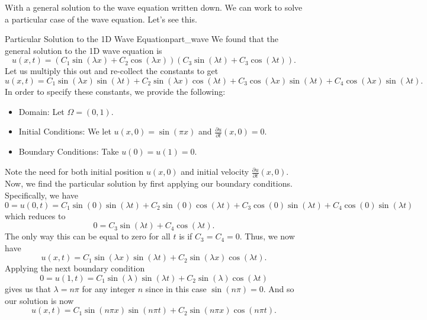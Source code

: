         With a general solution to the wave equation written down.  We can work to solve a particular case of the wave equation.  Let's see this.
        
        \begin{ex}{Particular Solution to the 1D Wave Equation}{part_wave}
        We found that the general solution to the 1D wave equation is
        \[
        u(x,t)=(C_1 \sin(\lambda x)+ C_2 \cos(\lambda x))(C_3 \sin(\lambda t)+ C_3 \cos(\lambda t)).
        \]
        Let us multiply this out and re-collect the constants to get
        \[
        u(x,t) = C_1 \sin(\lambda x)\sin(\lambda t) + C_2 \sin(\lambda x)\cos(\lambda t) + C_3 \cos(\lambda x)\sin(\lambda t)+ C_4 \cos(\lambda x)\sin(\lambda t).
        \]
        In order to specify these constants, we provide the following:
        \begin{itemize}
            \item Domain: Let $\Omega=(0,1)$.
            \item Initial Conditions: We let $u(x,0)=\sin(\pi x)$ and $\frac{\partial u}{\partial t}(x,0)=0.$ 
            \item Boundary Conditions: Take $u(0)=u(1)=0$.
        \end{itemize}
        Note the need for both initial position $u(x,0)$ and initial velocity $\frac{\partial u}{\partial t}(x,0)$.\\
        
        Now, we find the particular solution by first applying our boundary conditions.  Specifically, we have
        \[
        0=u(0,t)= C_1 \sin(0)\sin(\lambda t) + C_2 \sin(0)\cos(\lambda t) + C_3 \cos(0)\sin(\lambda t)+ C_4 \cos(0)\sin(\lambda t) 
        \]
        which reduces to
        \[
        0= C_3 \sin(\lambda t)+ C_4 \cos(\lambda t).
        \]
        The only way this can be equal to zero for all $t$ is if $C_3=C_4=0$.  Thus, we now have
        \[
        u(x,t) = C_1 \sin(\lambda x)\sin(\lambda t) + C_2 \sin(\lambda x)\cos(\lambda t).
        \]
        Applying the next boundary condition
        \[
        0=u(1,t)= C_1 \sin(\lambda ) \sin(\lambda t) + C_2 \sin(\lambda)\cos(\lambda t)
        \]
        gives us that $\lambda = n\pi$ for any integer $n$ since in this case $\sin(n\pi)=0$. And so our solution is now
        \[
        u(x,t) = C_1 \sin(n \pi x) \sin(n \pi t) + C_2 \sin(n \pi x)\cos (n \pi t).
        \]
        

\end{ex}
